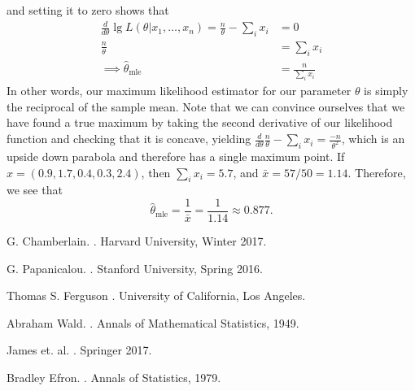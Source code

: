 \documentclass[12pt]{article}\usepackage[]{graphicx}\usepackage[]{color}
\begin{document}
and setting it to zero shows that   \begin{align*} \frac{d}{d \theta} \lg L(\theta |x_1, \ldots, x_n) = \frac{n}{\theta} - \sum_i x_i &= 0 \\ \frac{n}{\theta} &= \sum_i x_i \\ \implies \hat{\theta}_{\text{mle}} &= \frac{n}{\sum_i x_i} \end{align*}  In other words, our maximum likelihood estimator for our parameter $\theta$ is simply the reciprocal of the sample mean. Note that we can convince ourselves that we have found a true maximum by taking the second derivative of our likelihood function and checking that it is concave, yielding  $\frac{d}{d \theta} \frac{n}{\theta} - \sum_i x_i = \frac{-n}{\theta^2}$, which is an upside down parabola and therefore has a single maximum point.  If $x = (0.9, 1.7, 0.4, 0.3, 2.4)$, then $\sum_i x_i = 5.7$, and $\bar{x} = 57/50 = 1.14$. Therefore, we see that  \[ \hat{\theta}_{\text{mle}} = \frac{1}{\bar{x}} = \frac{1}{1.14} \approx 0.877. \] 


\begin{thebibliography}{10}
G. Chamberlain.
.
\newblock Harvard University, Winter 2017.

G. Papanicalou.
.
\newblock Stanford University, Spring 2016.

Thomas S. Ferguson
.
\newblock University of California, Los Angeles.

Abraham Wald.
.
\newblock Annals of Mathematical Statistics, 1949.

James et. al.
.
\newblock Springer 2017.


Bradley Efron.
.
\newblock Annals of Statistics, 1979.

\end{thebibliography}
  
\end{document}
